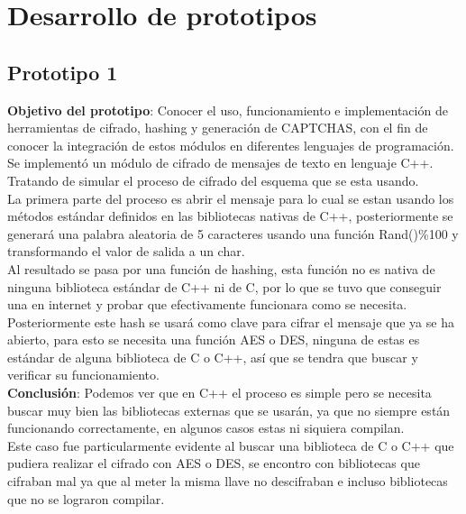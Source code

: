 \chapter{Desarrollo de prototipos}

\section{Prototipo 1}
\textbf{Objetivo del prototipo}:
Conocer el uso, funcionamiento e implementación de herramientas de cifrado, hashing y generación de CAPTCHAS, con el fin de conocer la integración de estos módulos en diferentes lenguajes de programación.\\
Se implementó un módulo de cifrado de mensajes de texto en lenguaje C++. Tratando de simular el proceso de cifrado del esquema que se esta usando.\\
La primera parte del proceso es abrir el mensaje para lo cual se estan usando los métodos estándar definidos en las bibliotecas nativas de C++, posteriormente se generará una palabra aleatoria de 5 caracteres usando una función Rand()\%100 y transformando el valor de salida a un char.\\
Al resultado se pasa por una función de hashing, esta función no es nativa de ninguna biblioteca estándar de C++ ni de C, por lo que se tuvo que conseguir una en internet y probar que efectivamente funcionara como se necesita.\\
Posteriormente este hash se usará como clave para cifrar el mensaje que ya se ha abierto, para esto se necesita una función AES o DES, ninguna de estas es estándar de alguna biblioteca de C o C++, así que se tendra que buscar y verificar su funcionamiento.\\


\textbf{Conclusión}:
Podemos ver que en C++ el proceso es simple pero se necesita buscar muy bien las bibliotecas externas que se usarán, ya que no siempre están funcionando correctamente, en algunos casos estas ni siquiera compilan.\\
Este caso fue particularmente evidente al buscar una biblioteca de C o C++ que pudiera realizar el cifrado con AES o DES, se encontro con bibliotecas que cifraban mal ya que al meter la misma llave no descifraban e incluso bibliotecas que no se lograron compilar.\\


